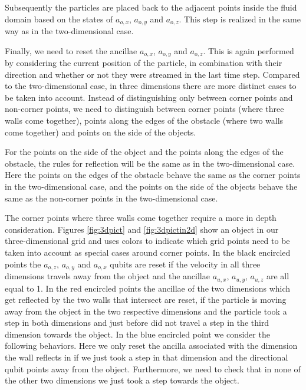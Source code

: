 Subsequently the particles are placed back to the adjacent points inside the fluid domain based on the states of $a_{o,x}$, $a_{o,y}$ and $a_{o,z}$. This step is realized in the same way as in the two-dimensional case.

Finally, we need to reset the ancillae $a_{o,x}$, $a_{o,y}$ and $a_{o,z}$. This is again performed by considering the current position of the particle, in combination with their direction and whether or not they were streamed in the last time step. Compared to the two-dimensional case, in three dimensions there are more distinct cases to be taken into account. Instead of distinguishing only between corner points and non-corner points, we need to distinguish between corner points (where three walls come together), points along the edges of the obstacle (where two walls come together) and points on the side of the objects. 

For the points on the side of the object and the points along the edges of the obstacle, the rules for reflection will be the same as in the two-dimensional case. Here the points on the edges of the obstacle behave the same as the corner points in the two-dimensional case, and the points on the side of the objects behave the same as the non-corner points in the two-dimensional case. 

The corner points where three walls come together require a more in depth consideration. Figures \ref{fig:3dpict} and \ref{fig:3dpictin2d} show an object in our three-dimensional grid and uses colors to indicate which grid points need to be taken into account as special cases around corner points.
In the black encircled points the $a_{o,z}$, $a_{o,y}$ and $a_{o,x}$ qubits are reset if the velocity in all three dimensions travels away from the object and the ancillae $a_{u,x}$, $a_{u,y}$, $a_{u,z}$ are all equal to 1. 
In the red encircled points the ancillae of the two dimensions which get reflected by the two walls that intersect are reset, if the particle is moving away from the object in the two respective dimensions and the particle took a step in both dimensions and just before did not travel a step in the third dimension towards the object.
In the blue encircled point we consider the following behaviors. Here we only reset the ancilla associated with the dimension the wall reflects in if we just took a step in that dimension and the directional qubit points away from the object. Furthermore, we need to check that in none of the other two dimensions we just took a step towards the object. 

